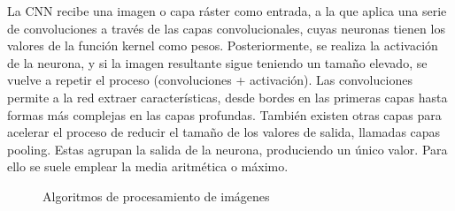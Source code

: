 La CNN recibe una imagen o capa ráster como entrada, a la que aplica una serie de convoluciones a través de las capas convolucionales,
cuyas neuronas tienen los valores de la función kernel como pesos. 
Posteriormente, se realiza la activación de la neurona, y si la imagen resultante sigue teniendo un tamaño elevado, se vuelve a repetir el proceso (convoluciones + activación).
Las convoluciones permite a la red extraer características, desde bordes en las primeras capas hasta formas más complejas en las capas profundas.  
También existen otras capas para acelerar el proceso de reducir el tamaño de los valores de salida, llamadas capas pooling.
Estas agrupan la salida de la neurona, produciendo un único valor. Para ello se suele emplear la media aritmética o máximo.

\begin{figure}[H]
    \centering
    \caption{Algoritmos de procesamiento de imágenes} \label{fig:preprocesamiento-imagenes} 
\end{figure} 

